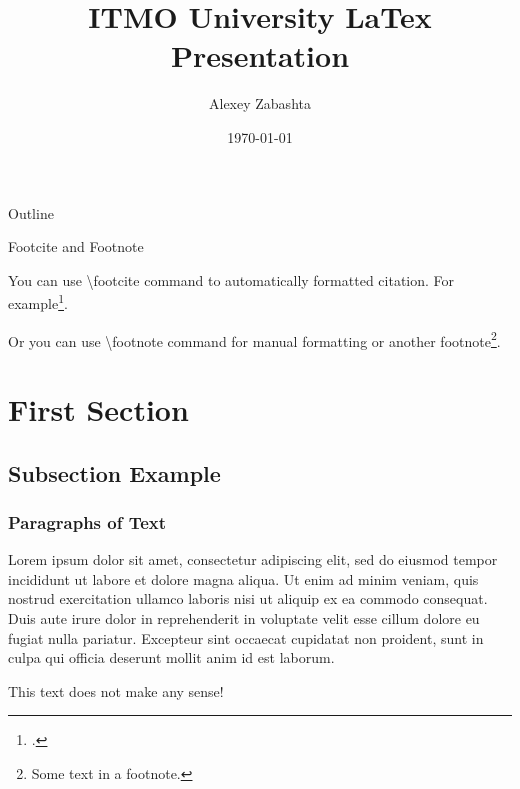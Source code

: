 \documentclass[aspectratio=169]{beamer}
\title[ITMO LaTex]{ITMO University LaTex Presentation}
\author[Zabashta A.]{Alexey Zabashta}
\date{\today}
\begin{document}
\begin{frame}[plain]
    \titlepage
\end{frame}





\begin{frame}{Outline}
 \tableofcontents
\end{frame}



\begin{frame}{Footcite and Footnote}

You can use \textbackslash footcite command to automatically formatted citation. For example\footcite{kopka1995guide}.

Or you can use \textbackslash footnote command for manual formatting or another footnote\footnote{Some text in a footnote.}.
\end{frame}



\section{First Section}

\subsection{Subsection Example} 

\begin{frame}
\frametitle{Paragraphs of Text}
Lorem ipsum dolor sit amet, consectetur adipiscing elit, sed do eiusmod tempor incididunt ut labore et dolore magna aliqua. Ut enim ad minim veniam, quis nostrud exercitation ullamco laboris nisi ut aliquip ex ea commodo consequat. Duis aute irure dolor in reprehenderit in voluptate velit esse cillum dolore eu fugiat nulla pariatur. Excepteur sint occaecat cupidatat non proident, sunt in culpa qui officia deserunt mollit anim id est laborum.

\alert{This text does not make any sense!}

\end{frame}
\end{document}
